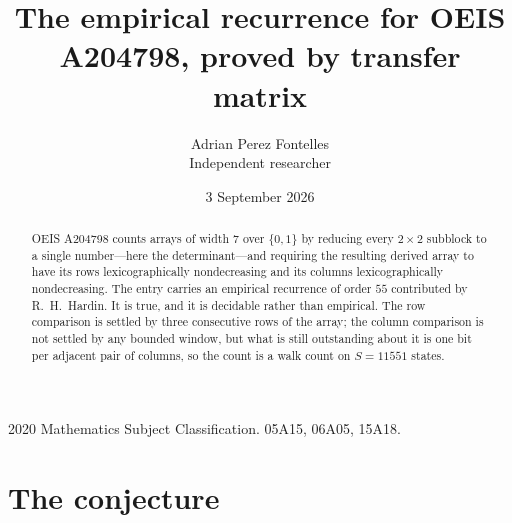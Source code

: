 \documentclass[11pt,a4paper]{article}
\title{The empirical recurrence for OEIS A204798, proved by transfer matrix}
\author{Adrian Perez Fontelles\\ \small Independent researcher}
\date{3 September 2026}
\theoremstyle{plain}
\theoremstyle{definition}
\begin{document}
\maketitle

\begin{abstract}
OEIS A204798 counts arrays of width $7$ over $\{0,1\}$ by reducing every $2\times2$ subblock to a
single number---here the determinant---and requiring the resulting derived array to have its rows
lexicographically nondecreasing and its columns lexicographically nondecreasing. The entry carries an
empirical recurrence of order $55$ contributed by R.~H.~Hardin. It is true, and it is
decidable rather than empirical. The row comparison is settled by three consecutive rows of the
array; the column comparison is not settled by any bounded window, but what is still outstanding
about it is one bit per adjacent pair of columns, so the count is a walk count on $S=11551$
states.
\end{abstract}

\noindent\small 2020 Mathematics Subject Classification. 05A15, 06A05, 15A18.\normalsize

\section{The conjecture}
\end{document}
